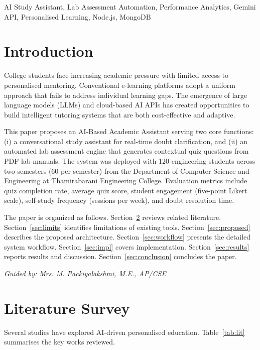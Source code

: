 \documentclass[conference]{IEEEtran}
\begin{document}
\begin{IEEEkeywords}
AI Study Assistant, Lab Assessment Automation, Performance Analytics, Gemini API, Personalised Learning, Node.js, MongoDB
\end{IEEEkeywords}

\section{Introduction}

College students face increasing academic pressure with limited access to personalised mentoring. Conventional e-learning platforms adopt a uniform approach that fails to address individual learning gaps. The emergence of large language models (LLMs) and cloud-based AI APIs has created opportunities to build intelligent tutoring systems that are both cost-effective and adaptive.

This paper proposes an AI-Based Academic Assistant serving two core functions: (i) a conversational study assistant for real-time doubt clarification, and (ii) an automated lab assessment engine that generates contextual quiz questions from PDF lab manuals. The system was deployed with 120 engineering students across two semesters (60 per semester) from the Department of Computer Science and Engineering at Thamirabarani Engineering College. Evaluation metrics include quiz completion rate, average quiz score, student engagement (five-point Likert scale), self-study frequency (sessions per week), and doubt resolution time.

The paper is organized as follows. Section~\ref{sec:lit} reviews related literature. Section~\ref{sec:limits} identifies limitations of existing tools. Section~\ref{sec:proposed} describes the proposed architecture. Section~\ref{sec:workflow} presents the detailed system workflow. Section~\ref{sec:impl} covers implementation. Section~\ref{sec:results} reports results and discussion. Section~\ref{sec:conclusion} concludes the paper.

\textit{Guided by: Mrs. M. Packiyalakshmi, M.E., AP/CSE}

\section{Literature Survey}
\label{sec:lit}

Several studies have explored AI-driven personalised education. Table~\ref{tab:lit} summarises the key works reviewed.
\end{document}
